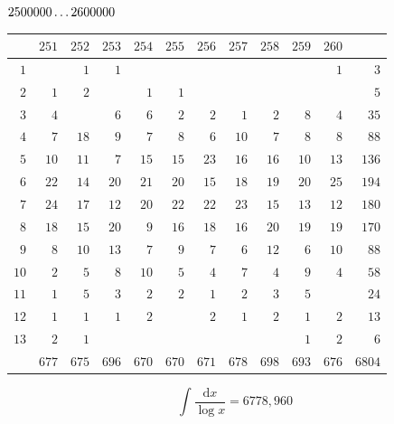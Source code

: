 \par\medskip
\noindent\begin{minipage}{\linewidth}\centering
{}
\(2500000\mathinner{.\,.\,.}2600000\)\par\smallskip
\begingroup\fontsize{10.5}{11.5}\selectfont\setlength{\tabcolsep}{3.5pt}\renewcommand{\arraystretch}{1}
\begin{tabular}{r|rrrrrrrrrr|r}\hline
 & $251$ & $252$ & $253$ & $254$ & $255$ & $256$ & $257$ & $258$ & $259$ & $260$ &  \\ \hline
$1$ &  & $1$ & $1$ &  &  &  &  &  &  & $1$ & $3$ \\
$2$ & $1$ & $2$ &  & $1$ & $1$ &  &  &  &  &  & $5$ \\
$3$ & $4$ &  & $6$ & $6$ & $2$ & $2$ & $1$ & $2$ & $8$ & $4$ & $35$ \\
$4$ & $7$ & $18$ & $9$ & $7$ & $8$ & $6$ & $10$ & $7$ & $8$ & $8$ & $88$ \\
$5$ & $10$ & $11$ & $7$ & $15$ & $15$ & $23$ & $16$ & $16$ & $10$ & $13$ & $136$ \\
$6$ & $22$ & $14$ & $20$ & $21$ & $20$ & $15$ & $18$ & $19$ & $20$ & $25$ & $194$ \\
$7$ & $24$ & $17$ & $12$ & $20$ & $22$ & $22$ & $23$ & $15$ & $13$ & $12$ & $180$ \\
$8$ & $18$ & $15$ & $20$ & $9$ & $16$ & $18$ & $16$ & $20$ & $19$ & $19$ & $170$ \\
$9$ & $8$ & $10$ & $13$ & $7$ & $9$ & $7$ & $6$ & $12$ & $6$ & $10$ & $88$ \\
$10$ & $2$ & $5$ & $8$ & $10$ & $5$ & $4$ & $7$ & $4$ & $9$ & $4$ & $58$ \\
$11$ & $1$ & $5$ & $3$ & $2$ & $2$ & $1$ & $2$ & $3$ & $5$ &  & $24$ \\
$12$ & $1$ & $1$ & $1$ & $2$ &  & $2$ & $1$ & $2$ & $1$ & $2$ & $13$ \\
$13$ & $2$ & $1$ &  &  &  &  &  &  & $1$ & $2$ & $6$ \\
\hline
 & $677$ & $675$ & $696$ & $670$ & $670$ & $671$ & $678$ & $698$ & $693$ & $676$ & $6804$ \\ \hline
\end{tabular}\par\endgroup
\setlength{\abovedisplayskip}{6pt}\setlength{\belowdisplayskip}{4pt}
\[\int\frac{\mathrm{d}x}{\log x}=6778{,}960\]
\end{minipage}\par
